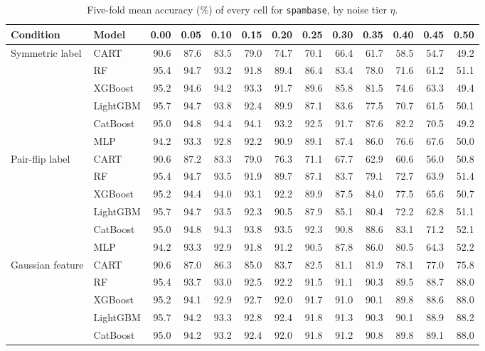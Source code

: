 \begin{table}[p]
\centering
\tiny
\setlength{\tabcolsep}{2.6pt}
\caption{Five-fold mean accuracy (\%) of every cell for \texttt{spambase}, by noise tier $\eta$.}
\label{tab:grid_spambase}
\begin{tabular}{@{}llrrrrrrrrrrr@{}}
\toprule
Condition & Model & 0.00 & 0.05 & 0.10 & 0.15 & 0.20 & 0.25 & 0.30 & 0.35 & 0.40 & 0.45 & 0.50 \\
\midrule
Symmetric label & CART & 90.6 & 87.6 & 83.5 & 79.0 & 74.7 & 70.1 & 66.4 & 61.7 & 58.5 & 54.7 & 49.2 \\
 & RF & 95.4 & 94.7 & 93.2 & 91.8 & 89.4 & 86.4 & 83.4 & 78.0 & 71.6 & 61.2 & 51.1 \\
 & XGBoost & 95.2 & 94.6 & 94.2 & 93.3 & 91.7 & 89.6 & 85.8 & 81.5 & 74.6 & 63.3 & 49.4 \\
 & LightGBM & 95.7 & 94.7 & 93.8 & 92.4 & 89.9 & 87.1 & 83.6 & 77.5 & 70.7 & 61.5 & 50.1 \\
 & CatBoost & 95.0 & 94.8 & 94.4 & 94.1 & 93.2 & 92.5 & 91.7 & 87.6 & 82.2 & 70.5 & 49.2 \\
 & MLP & 94.2 & 93.3 & 92.8 & 92.2 & 90.9 & 89.1 & 87.4 & 86.0 & 76.6 & 67.6 & 50.0 \\
\midrule
Pair-flip label & CART & 90.6 & 87.2 & 83.3 & 79.0 & 76.3 & 71.1 & 67.7 & 62.9 & 60.6 & 56.0 & 50.8 \\
 & RF & 95.4 & 94.7 & 93.5 & 91.9 & 89.7 & 87.1 & 83.7 & 79.1 & 72.7 & 63.9 & 51.4 \\
 & XGBoost & 95.2 & 94.4 & 94.0 & 93.1 & 92.2 & 89.9 & 87.5 & 84.0 & 77.5 & 65.6 & 50.7 \\
 & LightGBM & 95.7 & 94.7 & 93.5 & 92.3 & 90.5 & 87.9 & 85.1 & 80.4 & 72.2 & 62.8 & 51.1 \\
 & CatBoost & 95.0 & 94.8 & 94.3 & 93.8 & 93.5 & 92.3 & 90.8 & 88.6 & 83.1 & 71.2 & 52.1 \\
 & MLP & 94.2 & 93.3 & 92.9 & 91.8 & 91.2 & 90.5 & 87.8 & 86.0 & 80.5 & 64.3 & 52.2 \\
\midrule
Gaussian feature & CART & 90.6 & 87.0 & 86.3 & 85.0 & 83.7 & 82.5 & 81.1 & 81.9 & 78.1 & 77.0 & 75.8 \\
 & RF & 95.4 & 93.7 & 93.0 & 92.5 & 92.2 & 91.5 & 91.1 & 90.3 & 89.5 & 88.7 & 88.0 \\
 & XGBoost & 95.2 & 94.1 & 92.9 & 92.7 & 92.0 & 91.7 & 91.0 & 90.1 & 89.8 & 88.6 & 88.0 \\
 & LightGBM & 95.7 & 94.2 & 93.3 & 92.8 & 92.4 & 91.8 & 91.3 & 90.3 & 90.1 & 88.9 & 88.2 \\
 & CatBoost & 95.0 & 94.2 & 93.2 & 92.4 & 92.0 & 91.8 & 91.2 & 90.8 & 89.8 & 89.1 & 88.0 \\

\end{tabular}
\end{table}
